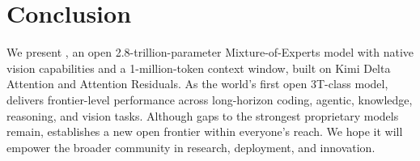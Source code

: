 \section{Conclusion}

We present , an open 2.8-trillion-parameter Mixture-of-Experts model with native vision capabilities and a 1-million-token context window, built on Kimi Delta Attention and Attention Residuals. 
As the world's first open 3T-class model,  delivers frontier-level performance across long-horizon
coding, agentic, knowledge, reasoning, and vision tasks. 
Although gaps to the strongest proprietary models remain,  establishes a new open frontier within everyone's reach. We hope it will empower the broader community in research, deployment, and innovation.


